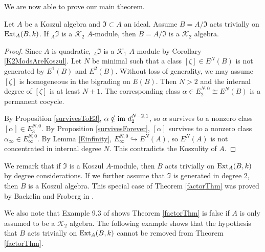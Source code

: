 \documentclass[11pt,righttag]{amsart}
\begin{document}
We are now able to prove our main theorem.

 
  \begin{thm} 
  \label{factorThm}
  Let $A$ be a Koszul algebra and ${\mathfrak{I}}\subset A$ an ideal. Assume $B=A/{\mathfrak{I}}$ acts trivially on ${\hbox{{\rm Ext}}}_A(B,k)$.
 If $_A{\mathfrak{I}}$ is a ${{\mathcal K}}_2$ $A$-module, then $B=A/{\mathfrak{I}}$ is a ${{\mathcal K}}_2$ algebra.
 \end{thm}
 
\begin{proof}
Since $A$ is quadratic, $_A{\mathfrak{I}}$ is a ${{\mathcal K}}_1$ $A$-module by Corollary \ref{K2ModsAreKoszul}.
Let $N$ be minimal such that a class $[{\zeta}]\in E^N(B)$ is not generated by $E^1(B)$ and $E^2(B)$. Without loss of generality, we may assume $[{\zeta}]$ is homogeneous in the bigrading on $E(B)$. Then $N>2$ and the internal degree of $[{\zeta}]$ is at least $N+1$. The corresponding class ${\alpha}\in E_2^{N,0}{\cong} E^N(B)$ is a permanent cocycle.

By Proposition \ref{survivesToE3}, ${\alpha}\notin{\hbox{im}}\ d_2^{N-2,1}$, so ${\alpha}$ survives to a nonzero class $[{\alpha}]\in E_3^{N,0}$. By Proposition \ref{survivesForever}, $[{\alpha}]$ survives to a nonzero class ${\alpha}_{\infty}\in E_{\infty}^{N,0}$. By Lemma \ref{Einfinity}, $E_{\infty}^{N,0}\hookrightarrow E^N(A)$, so $E^N(A)$ is not concentrated in internal degree $N$. This contradicts the Koszulity of $A$.

\end{proof}

We remark that if ${\mathfrak{I}}$ is a Koszul $A$-module, then $B$ acts trivially on ${\hbox{{\rm Ext}}}_A(B,k)$ by degree considerations. If we further assume that ${\mathfrak{I}}$ is generated in degree 2, then $B$ is a Koszul algebra. This special case of Theorem \ref{factorThm} was proved by Backelin and Froberg in \cite{BackFro}.

We also note that  Example 9.3 of \cite{CS} shows Theorem \ref{factorThm} is false if $A$ is only assumed to be a ${{\mathcal K}}_2$ algebra.
The following example shows that the hypothesis that $B$ acts trivially on ${\hbox{{\rm Ext}}}_A(B,k)$ cannot be removed from Theorem \ref{factorThm}.
\end{document}
